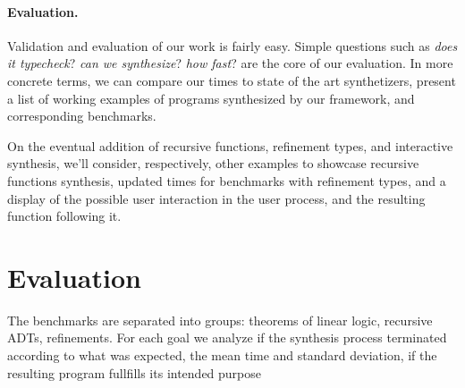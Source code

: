 \documentclass{llncs}
\newcommand{\lolli}{\multimap}
\newcommand{\tensor}{\otimes}
\newcommand{\bang}{{!}}
\newcommand{\mypara}[1]{\paragraph{\textbf{#1}.}}
\begin{document}
\mypara{Evaluation} Validation and evaluation of our work is fairly
easy. Simple questions such as \emph{does it typecheck}? \emph{can
  we synthesize}? \emph{how fast}?  are the core of our evaluation. In
more concrete terms, we can compare our times to state of the art
synthetizers, present a list of working examples of programs synthesized
by our framework, and corresponding benchmarks.

On the eventual addition of recursive functions, refinement types, and
interactive synthesis, we'll consider, respectively, other examples to
showcase recursive functions synthesis, updated times for benchmarks
with refinement types, and a display of the possible user interaction
in the user process, and the resulting function following it.






\section{Evaluation}

The benchmarks are separated into groups: theorems of linear logic, recursive
ADTs, refinements. For each goal we analyze if the synthesis process terminated
according to what was expected, the mean time and standard deviation, if the
resulting program fullfills its intended purpose

\end{document}
